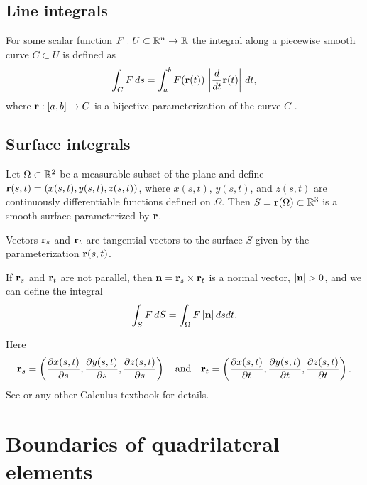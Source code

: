 \documentclass[11pt]{article}
\begin{document}
\subsection{Line integrals}
\label{sec-2-1}

For some scalar function $F : U \subset \mathbb{R}^{n} \to \mathbb{R}$
the integral along a piecewise smooth curve $C \subset U$ is defined as
\begin{equation}
\label{eq:1}
\int_{C} F\, ds = \int_{a}^{b} F(\mathbf{r}(t))\, \left| \frac{d}{dt}\mathbf{r}(t) \right|\, dt,
\end{equation}
where $\mathbf{r}: [a, b] \to C$ is a bijective parameterization of the curve
$C$ \cite{Nikolsky1977}.

\subsection{Surface integrals}
\label{sec-2-2}

Let $\Omega \subset \mathbb{R}^{2}$ be a measurable subset of the
plane and define $\mathbf{r}(s,t) = (x(s,t), y(s,t), z(s,t))$, where $x(s,
t)$, $y(s, t)$, and $z(s, t)$ are continuously differentiable
functions defined on $\Omega$. Then $S = \mathbf{r}(\Omega) \subset
\mathbb{R}^{3}$ is a smooth surface parameterized by $\mathbf{r}$.

Vectors $\mathbf{r}_{s}$ and $\mathbf{r}_{t}$ are tangential vectors to the surface $S$
given by the parameterization $\mathbf{r}(s,t)$.

If $\mathbf{r}_{s}$ and $\mathbf{r}_{t}$ are not parallel, then $\mathbf{n} = \mathbf{r}_{s} \times \mathbf{r}_{t}$ is
a normal vector, $| \mathbf{n} | > 0$, and we can define
the integral
\begin{equation}
\label{eq:2}
\int_{S} F\, dS = \int_{\Omega} F\, |\mathbf{n}|\, ds dt.
\end{equation}

Here
\begin{equation}
\label{eq:3}
\mathbf{r}_{s} = \left(\frac{\partial x(s,t)}{\partial s}, \frac{\partial y(s,t)}{\partial s}, \frac{\partial z(s,t)}{\partial s}\right) \quad \text{and} \quad
\mathbf{r}_{t} = \left(\frac{\partial x(s,t)}{\partial t}, \frac{\partial y(s,t)}{\partial t}, \frac{\partial z(s,t)}{\partial t}\right).
\end{equation}
See \cite{Nikolsky1977} or any other Calculus textbook for details.


\section{Boundaries of quadrilateral elements}
\label{sec-3}
\newcommand{\F}[2]{#1_{#2}^{1}}
\newcommand{\Fk}[1]{\F{#1}{k}}
\newcommand{\Fr}[1]{\F{#1}{*}}
\newcommand{\T}{\Fr{\R}(t)}
\newcommand{\Tq}{\Fr{\R}(t_{q})}
\newcommand{\Tkq}{\Fk{\R}(t_{q})}
\end{document}
